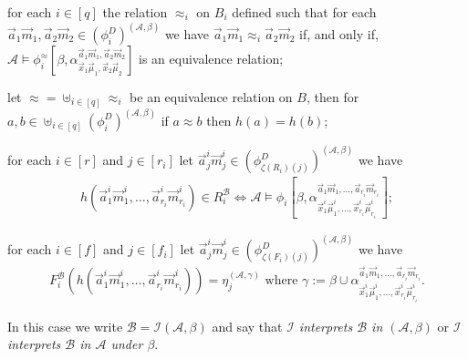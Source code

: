 \documentclass[../main/thesis.tex]{subfiles}
\begin{document}
\begin{definition}
  \begin{myenum}
  \item for each $i \in [q]$ the relation $\approx_i$ on $B_i$ defined such that
    for each $\vec{a}_1\vec{m}_1, \vec{a}_2\vec{m}_2 \in
    (\phi^D_i)^{(\mathcal{A}, \beta)}$ we have $\vec{a}_1\vec{m}_1 \approx_i
    \vec{a}_2\vec{m}_2$ if, and only if, $\mathcal{A} \models
    \phi^{\approx}_i[\beta, \alpha^{\vec{a}_1\vec{m}_1,
      \vec{a}_2\vec{m}_2}_{\vec{x}_1 \vec{\mu}_1, \vec{x}_2 \vec{\mu}_2}]$ is an
    equivalence relation;
  \item let $\approx = \uplus_{i \in [q]}\approx_i$ be an equivalence relation
    on $B$, then for $a , b \in \uplus_{i \in [q]}(\phi^D_i)^{(\mathcal{A},
      \beta)}$ if $a \approx b$ then $h(a) = h(b)$;
  \item for each $i \in [r]$ and $j \in [r_i]$ let $\vec{a}^i_j\vec{m}^i_j \in
    (\phi^D_{\zeta(R_i)(j)})^{(\mathcal{A}, \beta)}$ we have
    \begin{align*}
      h(\vec{a}^i_1 \vec{m}^i_1 , \ldots , \vec{a}^i_{r_i}\vec{m}^i_{r_i})
      \in R^{\mathcal{B}}_i \iff \mathcal{A} \models \phi_i
      [\beta, \alpha^{\vec{a}_1\vec{m}_1, \ldots, \vec{a}_{r_i} \vec{m}_{r_i}}_{\vec{x}^i_1 \vec{\mu}^i_1 , \ldots, \vec{x}^i_{r_i} \vec{\mu}^i_{r_i}}];
    \end{align*}
  \item for each $i \in [f]$ and $j \in [f_i]$ let $\vec{a}^i_j\vec{m}^i_j \in
    (\phi^D_{\zeta(F_i)(j)})^{(\mathcal{A}, \beta)}$ we have
    \begin{align*}
      F^{\mathcal{B}}_i(h(\vec{a}^i_1 \vec{m}^i_1 , \ldots , \vec{a}^i_{r_i}\vec{m}^i_{r_i})) = \eta^{(\mathcal{A}, \gamma)}_j \text{ where }\gamma := \beta \cup \alpha^{\vec{a}_1\vec{m}_1, \ldots,
      \vec{a}_{r_i} \vec{m}_{r_i}}_{\vec{x}^i_1 \vec{\mu}^i_1 , \ldots,
      \vec{x}^i_{r_i} \vec{\mu}^i_{r_i}}.
    \end{align*}
  \end{myenum}

  In this case we write $\mathcal{B} = \mathcal{I} (\mathcal{A}, \beta)$ and say
  that \emph{$\mathcal{I}$ interprets $\mathcal{B}$ in $(\mathcal{A}, \beta)$}
  or \emph{$\mathcal{I}$ interprets $\mathcal{B}$ in $\mathcal{A}$ under
    $\beta$}.
\end{definition}


\end{document}
